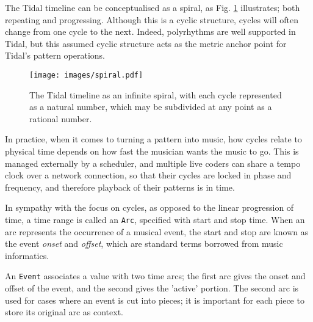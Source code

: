 \documentclass[authoryear,preprint]{sigplanconf}
\begin{document}
The Tidal timeline can be conceptualised as a spiral, as Fig.
\ref{fig:spiral} illustrates; both repeating and progressing. Although
this is a cyclic structure, cycles will often change from one cycle to
the next. Indeed, polyrhythms are well supported in Tidal, but this
assumed cyclic structure acts as the metric anchor point for Tidal's
pattern operations.


\begin{figure}[t]
    \centering
\texttt{[image: images/spiral.pdf]}
    \caption{The Tidal timeline as an infinite spiral, with each cycle represented as a natural number, which may be subdivided at any point as a rational number.}
    \label{fig:spiral}
\end{figure}

In practice, when it comes to turning a pattern into music, how cycles
relate to physical time depends on how fast the musician wants the
music to go. This is managed externally by a scheduler, and multiple
live coders can share a tempo clock over a network connection, so that
their cycles are locked in phase and frequency, and therefore playback
of their patterns is in time.

In sympathy with the focus on cycles, as opposed to the linear
progression of time, a time range is called an \lstinline{Arc},
specified with start and stop time. When an arc represents the
occurrence of a musical event, the start and stop are known as the
event \emph{onset} and \emph{offset}, which are standard terms
borrowed from music informatics.


An \lstinline{Event} associates a value with two time arcs; the first
arc gives the onset and offset of the event, and the second gives the
'active' portion. The second arc is used for cases where an event is
cut into pieces; it is important for each piece to store its original
arc as context.

\end{document}
